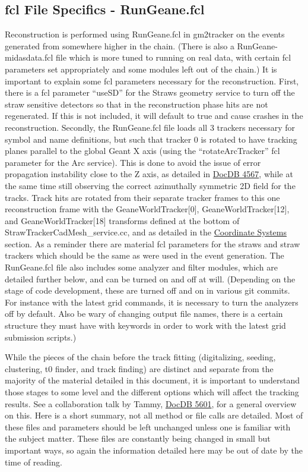   \subsection{fcl File Specifics - RunGeane.fcl} 
  \label{sec:RunGeane}

    Reconstruction is performed using RunGeane.fcl in gm2tracker on the events generated from somewhere higher in the chain. (There is also a RunGeane-midasdata.fcl file which is more tuned to running on real data, with certain fcl parameters set appropriately and some modules left out of the chain.) It is important to explain some fcl parameters necessary for the reconstruction. First, there is a fcl parameter ``useSD'' for the Straws geometry service to turn off the straw sensitive detectors so that in the reconstruction phase hits are not regenerated. If this is not included, it will default to true and cause crashes in the reconstruction. Secondly, the RunGeane.fcl file loads all 3 trackers necessary for symbol and name definitions, but such that tracker 0 is rotated to have tracking planes parallel to the global Geant X axis (using the ``rotateArcTracker'' fcl parameter for the Arc service). This is done to avoid the issue of error propagation instability close to the Z axis, as detailed in \href{http://gm2-docdb.fnal.gov:8080/cgi-bin/ShowDocument?docid=4567}{DocDB 4567}, while at the same time still observing the correct azimuthally symmetric 2D field for the tracks. Track hits are rotated from their separate tracker frames to this one reconstruction frame with the GeaneWorldTracker[0], GeaneWorldTracker[12], and GeaneWorldTracker[18] transforms defined at the bottom of StrawTrackerCadMesh\_service.cc, and as detailed in the \hyperref[sec:Coord]{Coordinate Systems} section. As a reminder there are material fcl parameters for the straws and straw trackers which should be the same as were used in the event generation. The RunGeane.fcl file also includes some analyzer and filter modules, which are detailed further below, and can be turned on and off at will. (Depending on the stage of code development, these are turned off and on in various git commits. For instance with the latest grid commands, it is necessary to turn the analyzers off by default. Also be wary of changing output file names, there is a certain structure they must have with keywords in order to work with the latest grid submission scripts.)

    While the pieces of the chain before the track fitting (digitalizing, seeding, clustering, t0 finder, and track finding) are distinct and separate from the majority of the material detailed in this document, it is important to understand those stages to some level and the different options which will affect the tracking results. See a collaboration talk by Tammy, \href{http://gm2-docdb.fnal.gov:8080/cgi-bin/ShowDocument?docid=5601}{DocDB 5601}, for a general overview on this. Here is a short summary, not all method or file calls are detailed. Most of these files and parameters should be left unchanged unless one is familiar with the subject matter. These files are constantly being changed in small but important ways, so again the information detailed here may be out of date by the time of reading.

